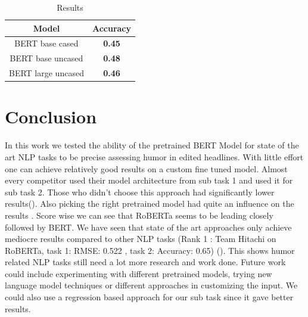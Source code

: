 \documentclass[11pt,a4paper,onecolumn,oneside,notitlepage]{article}
\begin{document}
    

\begin{table}
	\begin{center}
	\begin{tabular}{|c|c|}
		\hline
		\textbf{Model} &  \textbf{Accuracy}\\
		\hline
		\hline
		BERT base cased & \textbf{0.45}\\
		\hline
		BERT base uncased & \textbf{0.48}\\
		\hline
		BERT large uncased & \textbf{0.46}\\
		\hline
	\end{tabular}
	
	
	\caption{Results}\label{fig3}
	\end{center}
	
\end{table}		
\pagebreak
	\section{Conclusion}
	In this work we tested the ability of the pretrained BERT Model for state of the art NLP tasks to be precise assessing humor in edited headlines. With little effort one can achieve relatively good results on a custom fine tuned model.  Almost every competitor used their model architecture from sub task 1 and used it for sub task 2. Those who didn't choose this approach had significantly lower results(\textcite{Bert2}). Also picking the right pretrained model had quite an influence on the results . Score wise we can see that RoBERTa seems to be leading closely followed by BERT. We have seen that state of the art approaches  only achieve mediocre results compared to other NLP tasks (Rank 1 : Team Hitachi on RoBERTa, task 1: RMSE: 0.522 , task 2: Accuracy: 0.65) (\textcite{Bert2}). This shows humor related NLP tasks still need a lot more research and work done.
	Future work could include experimenting with different pretrained models, trying new language model techniques or different approaches in customizing the input. We could also use a regression based approach for our sub task since it gave better results.
	\printbibliography
\end{document}
